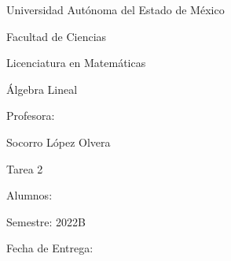 \documentclass{article}
\begin{document}
    \begin{titlepage}
        \centering
        Universidad Autónoma del Estado de México

        Facultad de Ciencias

        Licenciatura en Matemáticas

        Álgebra Lineal

        Profesora:

        Socorro López Olvera

        Tarea 2

        Alumnos:

        Semestre: 2022B

        Fecha de Entrega: 
        

    \end{titlepage}
\end{document}
